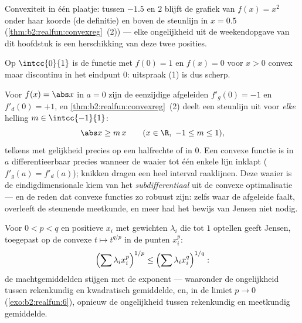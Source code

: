 \begin{omfigure}

{\small Convexiteit in één plaatje: tussen $-1.5$ en $2$ blijft de
grafiek van $f(x) = x^2$ onder haar koorde (de definitie) en boven
de steunlijn in $x = 0.5$
(\cref{thm:b2:realfun:convexreg}~(2)) --- elke ongelijkheid uit de
weekendopgave van dit hoofdstuk is een herschikking van deze twee
posities.}
\end{omfigure}

\begin{example}
Op $\intcc{0}{1}$ is de functie met $f(0) = 1$ en $f(x) = 0$ voor
$x > 0$ convex maar discontinu in het eindpunt $0$: uitspraak (1)
is dus scherp.
\end{example}

\begin{example}\label{ex:b2:realfun:corner}
Voor $f(x) = \abs x$ in $a = 0$ zijn de eenzijdige afgeleiden
$f'_g(0) = -1$ en $f'_d(0) = +1$, en
\cref{thm:b2:realfun:convexreg}~(2) deelt een steunlijn uit voor
\emph{elke} helling $m \in \intcc{-1}{1}$:
\[
\abs x \geq m\,x \qquad (x \in \R,\ -1 \leq m \leq 1),
\]
telkens met gelijkheid precies op een halfrechte of in $0$. Een
convexe functie is in $a$ differentieerbaar precies wanneer de
waaier tot één enkele lijn inklapt ($f'_g(a) = f'_d(a)$); knikken
dragen een heel interval raaklijnen. Deze waaier is de
eindigdimensionale kiem van het \emph{subdifferentiaal} uit de
convexe optimalisatie --- en de reden dat convexe functies zo
robuust zijn: zelfs waar de afgeleide faalt, overleeft de
steunende meetkunde, en meer had het bewijs van Jensen niet
nodig.
\end{example}

\begin{example}\label{ex:b2:realfun:powermeans}
Voor $0 < p < q$ en positieve $x_i$ met gewichten $\lambda_i$ die
tot $1$ optellen geeft Jensen, toegepast op de convexe $t \mapsto
t^{q/p}$ in de punten $x_i^p$:
\[
\Bigl(\sum \lambda_i x_i^{p}\Bigr)^{1/p}
\leq \Bigl(\sum \lambda_i x_i^{q}\Bigr)^{1/q} :
\]
de machtgemiddelden stijgen met de exponent --- waaronder de
ongelijkheid tussen rekenkundig en kwadratisch gemiddelde, en, in
de limiet $p \to 0$ (\cref{exo:b2:realfun:6}), opnieuw de
ongelijkheid tussen rekenkundig en meetkundig gemiddelde.
\end{example}

